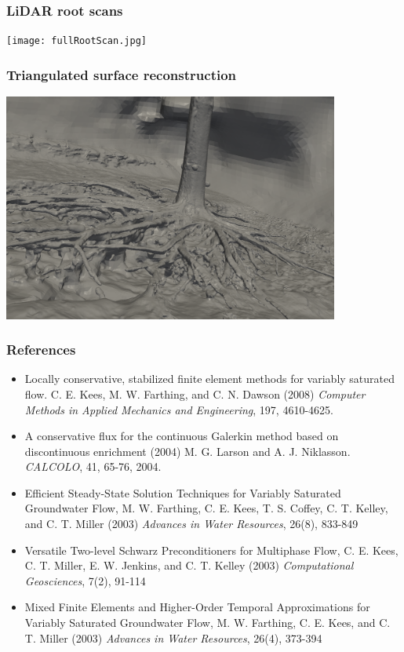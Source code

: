 \documentclass{beamer}
\begin{document}
\begin{frame}
\frametitle{LiDAR root scans}
\texttt{[image: fullRootScan.jpg]}
\end{frame}

\begin{frame}
\frametitle{Triangulated surface reconstruction}
\includegraphics[width=4.35in]{rootsPoissonRecon.png}
\end{frame}

\begin{frame}
  \frametitle{References}
  \begin{footnotesize}
    \begin{itemize}
      
    \item Locally conservative, stabilized finite element methods for
      variably saturated flow. C. E. Kees, M. W. Farthing, and C. N.
      Dawson (2008) {\em Computer Methods in Applied Mechanics and
        Engineering}, 197, 4610-4625.
      
    \item A conservative flux for the continuous Galerkin method based
      on discontinuous enrichment (2004) M. G. Larson and
      A. J. Niklasson. {\em CALCOLO}, 41, 65-76, 2004.
      
    \item Efficient Steady-State Solution Techniques for Variably
      Saturated Groundwater Flow, M. W. Farthing, C. E. Kees,
      T. S. Coffey, C. T. Kelley, and C. T.  Miller (2003) {\em Advances
        in Water Resources}, 26(8), 833-849
      
    \item Versatile Two-level Schwarz Preconditioners for Multiphase Flow,
      C. E. Kees, C. T. Miller, E. W. Jenkins, and C. T. Kelley (2003)
      {\em Computational Geosciences}, 7(2), 91-114
      
    \item Mixed Finite Elements and Higher-Order Temporal Approximations
      for Variably Saturated Groundwater Flow, M. W. Farthing, C. E. Kees,
      and C. T. Miller (2003) {\em Advances in Water Resources}, 26(4),
      373-394
      
    \end{itemize}
  \end{footnotesize}
\end{frame}
\end{document}

